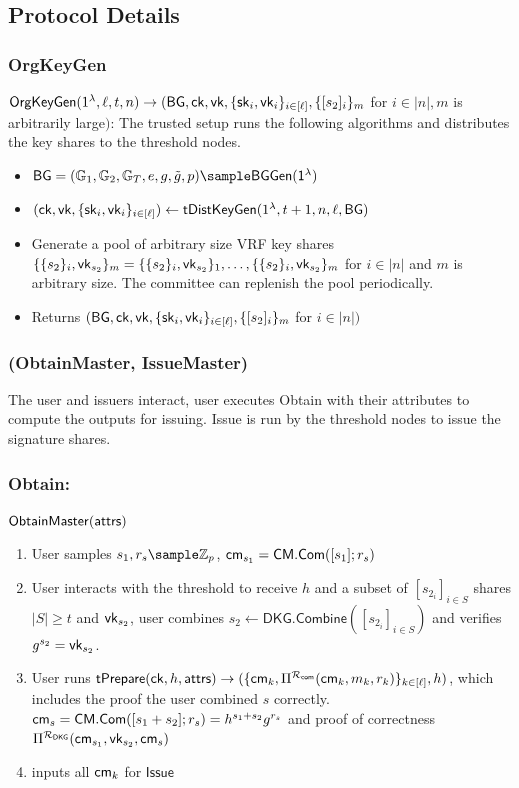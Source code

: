 \subsection{Protocol Details}

\subsubsection*{OrgKeyGen}

$\mathsf{OrgKeyGen}(1^{\lambda}, \ell, t, n) \to (\mathsf{BG}, \mathsf{ck}, \mathsf{vk}, \{\mathsf{sk}_i, \mathsf{vk}_i\}_{i \in [\ell]}, \{[s_2]_i\}_m$ for $i \in |n|, m$ is arbitrarily large$ ) $: The trusted setup runs the following algorithms and distributes the key shares to the threshold nodes.
    \begin{itemize}
        \item $\BG = (\G_1, \G_2, \G_T, e, g, \tilg, p) \sample \BGGen(\secparam)$
        \item $(\mathsf{ck}, \mathsf{vk}, \{\mathsf{sk}_i, \mathsf{vk}_i\}_{i \in [\ell]}) \gets \mathsf{tDistKeyGen}(1^{\lambda}, t+1, n, \ell, \mathsf{BG})$
        \item Generate a pool of arbitrary size VRF key shares $\{\{s_2\}_i, \mathsf{vk}_{s_2}\}_m = \{\{s_2\}_i, \mathsf{vk}_{s_2}\}_1, \ldots, \{\{s_2\}_i, \mathsf{vk}_{s_2}\}_m$ for $i \in |n|$ and $m$ is arbitrary size. The committee can replenish the pool periodically.
        \item Returns $(\mathsf{BG}, \mathsf{ck}, \mathsf{vk}, \{\mathsf{sk}_i, \mathsf{vk}_i\}_{i \in [\ell]}, \{[s_2]_i\}_m$ for $i \in |n| )$
    \end{itemize}

\subsubsection*{(ObtainMaster, IssueMaster)}
The user and issuers interact, user executes Obtain with their attributes to compute the outputs for issuing. Issue is run by the threshold nodes to issue the signature shares.
\subsubsection*{Obtain:}
$\mathsf{ObtainMaster}(\mathsf{attrs})$
\begin{enumerate}
    \item User samples $s_1, r_s \sample \Z_p$, $\mathsf{cm}_{s_1} = \mathsf{CM.Com}([s_1];r_s)$
    \item User interacts with the threshold to receive $h$ and a subset of $[s_{2_i}]_{i \in S}$ shares $|S| \geq t$ and $\mathsf{vk}_{s_2}$, user combines $s_2 \gets \mathsf{DKG.Combine}([s_{2_i}]_{i \in S})$ and verifies $g^{s_2} = \mathsf{vk}_{s_2}$. 
    \item User runs $\mathsf{tPrepare}(\mathsf{ck}, h, \mathsf{attrs}) \to (\{\mathsf{cm}_k, \Pi^{\mathcal{R}_{\mathsf{com}}}(\mathsf{cm}_k, m_k, r_k)\}_{k \in [\ell]}, h)$, which includes the proof the user combined $s$ correctly. $\mathsf{cm}_s = \mathsf{CM.Com}([s_1 + s_2];r_s) = h^{s_1 + s_2}g^{r_s}$ and proof of correctness $\Pi^{\mathcal{R}_{\mathsf{DKG}}}(\mathsf{cm}_{s_1},  \mathsf{vk}_{s_2}, \mathsf{cm}_s)$
    \item inputs all $\mathsf{cm}_k$ for $\mathsf{Issue}$
\end{enumerate}

